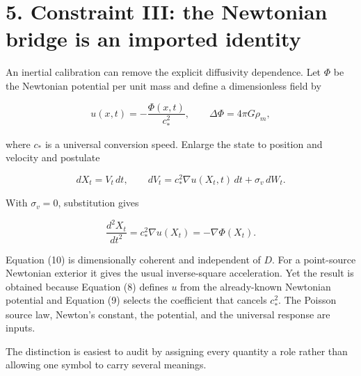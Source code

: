\documentclass[
  american,
  11pt,
  letterpaper,
]{article}
\begin{document}
\section{5. Constraint III: the Newtonian bridge is an imported identity}\label{constraint-iii-the-newtonian-bridge-is-an-imported-identity}

An inertial calibration can remove the explicit diffusivity dependence. Let \(\Phi\) be the Newtonian potential per unit mass and define a dimensionless field by

\begin{equation}
u(x,t)=-\frac{\Phi(x,t)}{c_*^2},
\qquad \Delta\Phi=4\pi G\rho_m,
\tag{8}
\end{equation}

where \(c_*\) is a universal conversion speed. Enlarge the state to position and velocity and postulate

\begin{equation}
dX_t=V_t\,dt,
\qquad dV_t=c_*^2\nabla u(X_t,t)\,dt+\sigma_v\,dW_t.
\tag{9}
\end{equation}

With \(\sigma_v=0\), substitution gives

\begin{equation}
\frac{d^2X_t}{dt^2}=c_*^2\nabla u(X_t)=-\nabla\Phi(X_t).
\tag{10}
\end{equation}

Equation (10) is dimensionally coherent and independent of \(D\). For a point-source Newtonian exterior it gives the usual inverse-square acceleration. Yet the result is obtained because Equation (8) defines \(u\) from the already-known Newtonian potential and Equation (9) selects the coefficient that cancels \(c_*^2\). The Poisson source law, Newton's constant, the potential, and the universal response are inputs.

The distinction is easiest to audit by assigning every quantity a role rather than allowing one symbol to carry several meanings.
\end{document}
